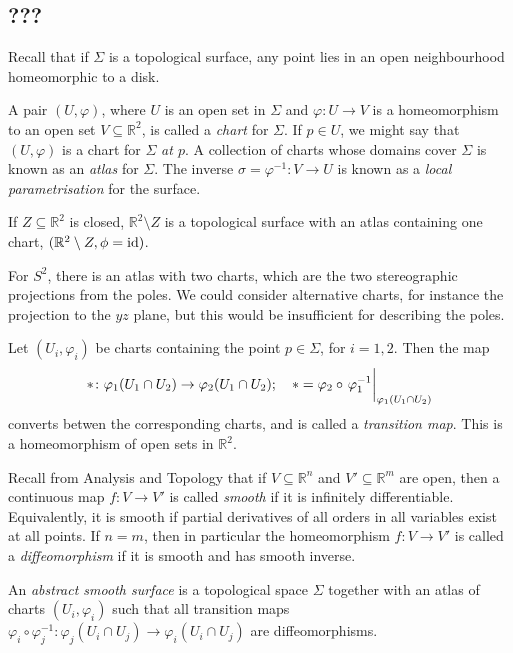 \subsection{???}
Recall that if \( \Sigma \) is a topological surface, any point lies in an open neighbourhood homeomorphic to a disk.
\begin{definition}
	A pair \( (U, \varphi) \), where \( U \) is an open set in \( \Sigma \) and \( \varphi \colon U \to V \) is a homeomorphism to an open set \( V \subseteq \mathbb R^2 \), is called a \textit{chart} for \( \Sigma \).
	If \( p \in U \), we might say that \( (U, \varphi) \) is a chart for \( \Sigma \) \textit{at \( p \)}.
	A collection of charts whose domains cover \( \Sigma \) is known as an \textit{atlas} for \( \Sigma \).
	The inverse \( \sigma = \varphi^{-1} \colon V \to U \) is known as a \textit{local parametrisation} for the surface.
\end{definition}
\begin{example}
	If \( Z \subseteq \mathbb R^2 \) is closed, \( \mathbb R^2 \setminus Z \) is a topological surface with an atlas containing one chart, \( (\mathbb R^2 \setminus Z, \phi = \operatorname{id}) \).

	For \( S^2 \), there is an atlas with two charts, which are the two stereographic projections from the poles.
	We could consider alternative charts, for instance the projection to the \( yz \) plane, but this would be insufficient for describing the poles.
\end{example}
\begin{definition}
	Let \( (U_i, \varphi_i) \) be charts containing the point \( p \in \Sigma \), for \( i = 1, 2 \).
	Then the map
	\[ \ast \colon \varphi_1(U_1 \cap U_2) \to \varphi_2(U_1 \cap U_2);\quad \ast = \varphi_2 \circ \eval{\varphi_1^{-1}}_{\varphi_1(U_1 \cap U_2)} \]
	converts betwen the corresponding charts, and is called a \textit{transition map}.
	This is a homeomorphism of open sets in \( \mathbb R^2 \).
\end{definition}
Recall from Analysis and Topology that if \( V \subseteq \mathbb R^n \) and \( V' \subseteq \mathbb R^m \) are open, then a continuous map \( f \colon V \to V' \) is called \textit{smooth} if it is infinitely differentiable.
Equivalently, it is smooth if partial derivatives of all orders in all variables exist at all points.
If \( n = m \), then in particular the homeomorphism \( f \colon V \to V' \) is called a \textit{diffeomorphism} if it is smooth and has smooth inverse.
\begin{definition}
	An \textit{abstract smooth surface} is a topological space \( \Sigma \) together with an atlas of charts \( (U_i, \varphi_i) \) such that all transition maps \( \varphi_i \circ \varphi_j^{-1} \colon \varphi_j(U_i \cap U_j) \to \varphi_i(U_i \cap U_j) \) are diffeomorphisms.
\end{definition}
